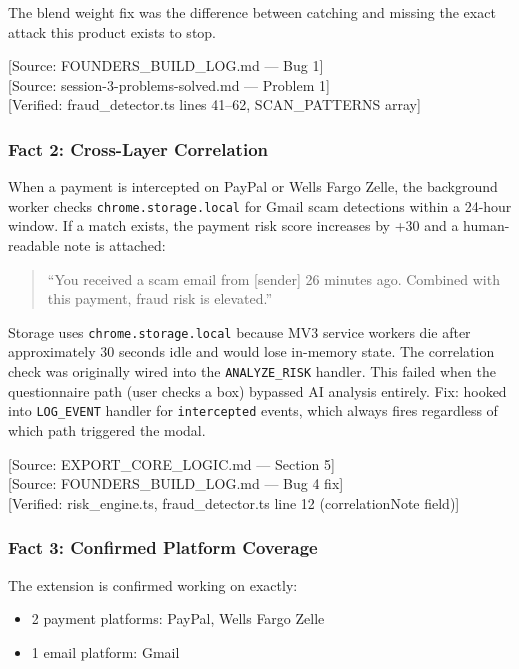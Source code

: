 \documentclass[11pt, letterpaper]{article}
\newcommand{\source}[1]{\textcolor{citation}{[Source: #1]}}
\newcommand{\verified}[1]{\textcolor{citation}{[Verified: #1]}}
\begin{document}
  The blend weight fix was the difference between catching and missing the exact attack this product exists to stop.

  \source{FOUNDERS\_BUILD\_LOG.md --- Bug 1}\\
  \source{session-3-problems-solved.md --- Problem 1}\\
  \verified{fraud\_detector.ts lines 41--62, SCAN\_PATTERNS array}

  \subsubsection{Fact 2: Cross-Layer Correlation}

  When a payment is intercepted on PayPal or Wells Fargo Zelle, the background worker checks \texttt{chrome.storage.local} for Gmail scam detections within a 24-hour window. If a match exists, the payment risk score increases by +30 and a human-readable note is attached:

  \begin{quote}
  ``You received a scam email from [sender] 26 minutes ago. Combined with this payment, fraud risk is elevated.''
  \end{quote}

  Storage uses \texttt{chrome.storage.local} because MV3 service workers die after approximately 30 seconds idle and would lose in-memory state. The correlation check was originally wired into the \texttt{ANALYZE\_RISK} handler. This failed when the questionnaire path (user checks a box) bypassed AI analysis entirely. Fix: hooked into \texttt{LOG\_EVENT} handler for \texttt{intercepted} events, which always fires regardless of which path triggered the modal.

  \source{EXPORT\_CORE\_LOGIC.md --- Section 5}\\
  \source{FOUNDERS\_BUILD\_LOG.md --- Bug 4 fix}\\
  \verified{risk\_engine.ts, fraud\_detector.ts line 12 (correlationNote field)}

  \subsubsection{Fact 3: Confirmed Platform Coverage}

  The extension is confirmed working on exactly:
  \begin{itemize}[nosep]
    \item 2 payment platforms: PayPal, Wells Fargo Zelle
    \item 1 email platform: Gmail
  \end{itemize}
\end{document}
